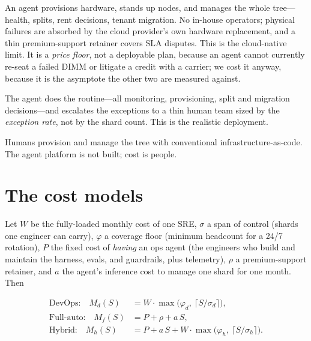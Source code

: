 \documentclass[11pt]{article}
\newcommand{\shards}{S}
\newcommand{\agentcost}{a}
\begin{document}
\begin{description}[leftmargin=0pt,labelsep=0.6em]
  \item[\textnormal{\textbf{(1) Full automation.}}] An agent provisions hardware, stands up nodes,
  and manages the whole tree---health, splits, rent decisions, tenant migration. No in-house
  operators; physical failures are absorbed by the cloud provider's own hardware replacement, and a
  thin premium-support retainer covers SLA disputes. This is the cloud-native limit. It is a
  \emph{price floor}, not a deployable plan, because an agent cannot currently re-seat a failed DIMM
  or litigate a credit with a carrier; we cost it anyway, because it is the asymptote the other two
  are measured against.
  \item[\textnormal{\textbf{(2) Agent in the mix (hybrid).}}] The agent does the routine---all
  monitoring, provisioning, split and migration decisions---and escalates the exceptions to a thin
  human team sized by the \emph{exception rate}, not by the shard count. This is the realistic
  deployment.
  \item[\textnormal{\textbf{(3) DevOps team.}}] Humans provision and manage the tree with
  conventional infrastructure-as-code. The agent platform is not built; cost is people.
\end{description}

\section{The cost models}
\label{sec:models}

Let $W$ be the fully-loaded monthly cost of one SRE, $\sigma$ a span of control (shards one engineer
can carry), $\varphi$ a coverage floor (minimum head\-count for a 24/7 rotation), $P$ the fixed cost
of \emph{having} an ops agent (the engineers who build and maintain the harness, evals, and
guardrails, plus telemetry), $\rho$ a premium-support retainer, and $\agentcost$ the agent's
inference cost to manage one shard for one month. Then

\begin{align}
\text{DevOps:}     \quad M_d(\shards) &= W\cdot\max\!\bigl(\varphi_d,\ \lceil \shards/\sigma_d\rceil\bigr), \label{eq:devops}\\
\text{Full-auto:}  \quad M_f(\shards) &= P + \rho + \agentcost\,\shards, \label{eq:full}\\
\text{Hybrid:}     \quad M_h(\shards) &= P + \agentcost\,\shards + W\cdot\max\!\bigl(\varphi_h,\ \lceil \shards/\sigma_h\rceil\bigr). \label{eq:hybrid}
\end{align}
\end{document}
